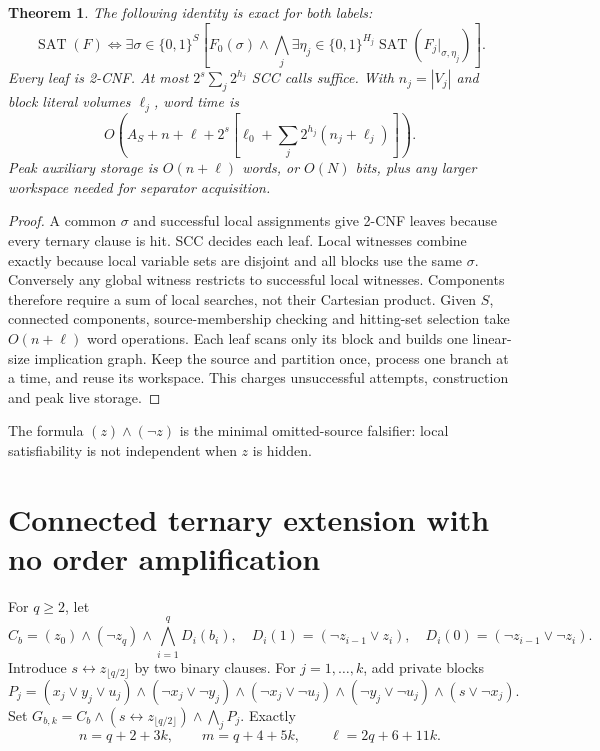 \documentclass[11pt]{article}
\newtheorem{theorem}{Theorem}
\begin{document}
\begin{theorem}
The following identity is exact for both labels:
\[
\operatorname{SAT}(F)\iff\exists\sigma\in\{0,1\}^{S}\left[F_0(\sigma)\wedge\bigwedge_j\exists\eta_j\in\{0,1\}^{H_j}\operatorname{SAT}(F_j|_{\sigma,\eta_j})\right].
\]
Every leaf is 2-CNF. At most $2^s\sum_j2^{h_j}$ SCC calls suffice. With $n_j=|V_j|$ and block literal volumes $\ell_j$, word time is
\[
O\left(A_S+n+\ell+2^s\left[\ell_0+\sum_j2^{h_j}(n_j+\ell_j)\right]\right).
\]
Peak auxiliary storage is $O(n+\ell)$ words, or $O(N)$ bits, plus any larger workspace needed for separator acquisition.
\end{theorem}
\begin{proof}
A common $\sigma$ and successful local assignments give 2-CNF leaves because every ternary clause is hit. SCC decides each leaf. Local witnesses combine exactly because local variable sets are disjoint and all blocks use the same $\sigma$. Conversely any global witness restricts to successful local witnesses. Components therefore require a sum of local searches, not their Cartesian product. Given $S$, connected components, source-membership checking and hitting-set selection take $O(n+\ell)$ word operations. Each leaf scans only its block and builds one linear-size implication graph. Keep the source and partition once, process one branch at a time, and reuse its workspace. This charges unsuccessful attempts, construction and peak live storage.
\end{proof}
The formula $(z)\wedge(\neg z)$ is the minimal omitted-source falsifier: local satisfiability is not independent when $z$ is hidden.

\section{Connected ternary extension with no order amplification}
For $q\ge2$, let
\[
C_b=(z_0)\wedge(\neg z_q)\wedge\bigwedge_{i=1}^{q}D_i(b_i),\quad D_i(1)=(\neg z_{i-1}\vee z_i),\quad D_i(0)=(\neg z_{i-1}\vee\neg z_i).
\]
Introduce $s\leftrightarrow z_{\lfloor q/2\rfloor}$ by two binary clauses. For $j=1,\ldots,k$, add private blocks
\[
P_j=(x_j\vee y_j\vee u_j)\wedge(\neg x_j\vee\neg y_j)\wedge(\neg x_j\vee\neg u_j)\wedge(\neg y_j\vee\neg u_j)\wedge(s\vee\neg x_j).
\]
Set $G_{b,k}=C_b\wedge(s\leftrightarrow z_{\lfloor q/2\rfloor})\wedge\bigwedge_jP_j$. Exactly
\[
n=q+2+3k,\qquad m=q+4+5k,\qquad\ell=2q+6+11k.
\]
\end{document}
